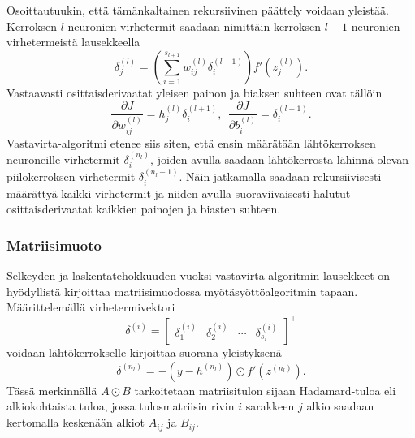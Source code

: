 \documentclass[12pt,a4paper,finnish,oneside,titlepage]{article}
\theoremstyle{plain}
\theoremstyle{definition}
\theoremstyle{remark}
\begin{document}
Osoittautuukin, että tämänkaltainen rekursiivinen päättely voidaan yleistää. Kerroksen \(l\) neuronien virhetermit saadaan nimittäin kerroksen \(l+1\) neuronien virhetermeistä lausekkeella \[\delta_j^{(l)}=\left(\sum_{i=1}^{s_{l+1}} w_{ij}^{(l)} \delta_i^{(l+1)}\right) f'(z_j^{(l)}).\] Vastaavasti osittaisderivaatat yleisen painon ja biaksen suhteen ovat tällöin \[\frac{\partial J}{\partial w_{ij}^{(l)}}=h_j^{(l)} \delta_i^{(l+1)}, \ \ \frac{\partial J}{\partial b_i^{(l)}}=\delta_i^{(l+1)}.\]
Vastavirta-algoritmi etenee siis siten, että ensin määrätään lähtökerroksen neuroneille virhetermit \(\delta_i^{(n_l)}\), joiden avulla saadaan lähtökerrosta lähinnä olevan piilokerroksen virhetermit \(\delta_i^{(n_l-1)}\). Näin jatkamalla saadaan rekursiivisesti määrättyä kaikki virhetermit ja niiden avulla suoraviivaisesti halutut osittaisderivaatat kaikkien painojen ja biasten suhteen.

\subsubsection{Matriisimuoto}
Selkeyden ja laskentatehokkuuden vuoksi vastavirta-algoritmin lausekkeet on hyödyllistä kirjoittaa matriisimuodossa myötäsyöttöalgoritmin tapaan. Määrittelemällä virhetermivektori \[\delta^{(i)}=\begin{bmatrix} \delta_1^{(i)} & \delta_2^{(i)} & \cdots & \delta_{s_i}^{(i)}\end{bmatrix}^{\top}\] voidaan lähtökerrokselle kirjoittaa suorana yleistyksenä \[\delta^{(n_l)}=-(y-h^{(n_l)})\odot f'(z^{(n_l)}).\] Tässä merkinnällä \(A\odot B\) tarkoitetaan matriisitulon sijaan Hadamard-tuloa eli alkiokohtaista tuloa, jossa tulosmatriisin rivin \(i\) sarakkeen \(j\) alkio saadaan kertomalla keskenään alkiot \(A_{ij}\) ja \(B_{ij}\).
\end{document}
